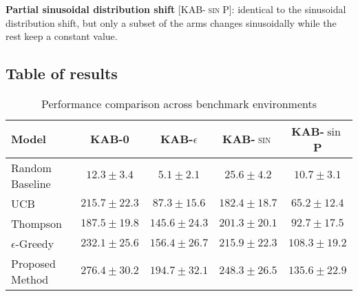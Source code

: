 \noindent \textbf{Partial sinusoidal distribution shift} [\textsc{KAB-$\sin$P}]: identical to the sinusoidal distribution shift, but only a subset of the arms changes sinusoidally while the rest keep a constant value.



\subsection{Table of results}

\begin{table}[htbp]
\centering
\caption{Performance comparison across benchmark environments}
\label{tab:model_performance}
\begin{tabular}{l c c c c}
\toprule
\textbf{Model} & \textbf{\textsc{KAB-0}} & \textbf{\textsc{KAB-$\epsilon$}} & \textbf{\textsc{KAB-$\sin$}} & \textbf{KAB-$\sin$P}\\
\midrule
Random Baseline & $12.3 \pm 3.4$ & $5.1 \pm 2.1$ & $25.6 \pm 4.2$ & $10.7 \pm 3.1$ \\
UCB & $215.7 \pm 22.3$ & $87.3 \pm 15.6$ & $182.4 \pm 18.7$ & $65.2 \pm 12.4$ \\
Thompson & $187.5 \pm 19.8$ & $145.6 \pm 24.3$ & $201.3 \pm 20.1$ & $92.7 \pm 17.5$ \\
$\epsilon$-Greedy & $232.1 \pm 25.6$ & $156.4 \pm 26.7$ & $215.9 \pm 22.3$ & $108.3 \pm 19.2$ \\
Proposed Method & $\mathbf{276.4 \pm 30.2}$ & $\mathbf{194.7 \pm 32.1}$ & $\mathbf{248.3 \pm 26.5}$ & $\mathbf{135.6 \pm 22.9}$ \\
\bottomrule
\end{tabular}
\end{table}
